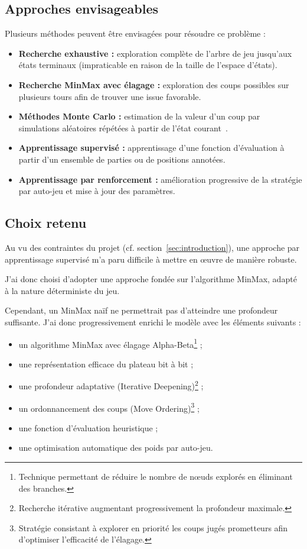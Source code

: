 \documentclass[11pt,a4paper]{article}
\begin{document}
\subsection{Approches envisageables}

Plusieurs méthodes peuvent être envisagées pour résoudre ce problème :

\begin{itemize}
  \item \textbf{Recherche exhaustive :} exploration complète de l'arbre de jeu jusqu'aux états terminaux (impraticable en raison de la taille de l'espace d'états).
  \item \textbf{Recherche MinMax avec élagage :} exploration des coups possibles sur plusieurs tours afin de trouver une issue favorable.
  \item \textbf{Méthodes Monte Carlo :} estimation de la valeur d'un coup par simulations aléatoires répétées à partir de l'état courant~\cite{Browne2012}.
  \item \textbf{Apprentissage supervisé :} apprentissage d'une fonction d'évaluation à partir d'un ensemble de parties ou de positions annotées.
  \item \textbf{Apprentissage par renforcement :} amélioration progressive de la stratégie par auto-jeu et mise à jour des paramètres.
\end{itemize}

\subsection{Choix retenu}

Au vu des contraintes du projet (cf. section~\ref{sec:introduction}), une approche par apprentissage supervisé m'a paru difficile
à mettre en œuvre de manière robuste.

J'ai donc choisi d'adopter une approche fondée sur l'algorithme MinMax, adapté à la nature déterministe du jeu.

Cependant, un MinMax naïf ne permettrait pas d'atteindre une profondeur suffisante. J'ai donc progressivement enrichi le modèle
avec les éléments suivants :

\begin{itemize}
  \item un algorithme MinMax avec élagage Alpha-Beta\footnote{Technique permettant de réduire le nombre de nœuds explorés en éliminant des branches.} ;
  \item une représentation efficace du plateau bit à bit ;
  \item une profondeur adaptative (Iterative Deepening)\footnote{Recherche itérative augmentant progressivement la profondeur maximale.} ;
  \item un ordonnancement des coups (Move Ordering)\footnote{Stratégie consistant à explorer en priorité les coups jugés prometteurs afin d'optimiser l'efficacité de l'élagage.} ;
  \item une fonction d'évaluation heuristique ;
  \item une optimisation automatique des poids par auto-jeu.
\end{itemize}
\end{document}
